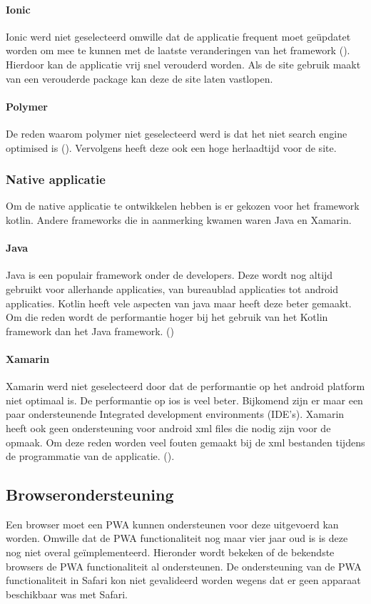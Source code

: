 \paragraph{Ionic}
Ionic werd niet geselecteerd omwille dat de applicatie frequent moet geüpdatet worden om mee te kunnen met de laatste veranderingen van het framework (\cite{ICONIC}). Hierdoor kan de applicatie vrij snel verouderd worden. Als de site gebruik maakt van een verouderde package kan deze de site laten vastlopen.

\paragraph{Polymer}
De reden waarom polymer niet geselecteerd werd is dat het niet search engine optimised is (\cite{POLYMER}). Vervolgens heeft deze ook een hoge herlaadtijd voor de site.

\subsubsection{Native applicatie}
Om de native applicatie te ontwikkelen hebben is er gekozen voor het framework kotlin. Andere frameworks die in aanmerking kwamen waren Java en Xamarin.

\paragraph{Java}
Java is een populair framework onder de developers. Deze wordt nog altijd gebruikt voor allerhande applicaties, van bureaublad applicaties tot android applicaties. Kotlin heeft vele aspecten van java maar heeft deze beter gemaakt. Om die reden wordt de performantie hoger bij het gebruik van het Kotlin framework dan het Java framework. (\cite{KOTLIN_VS_JAVA})

\paragraph{Xamarin}
Xamarin werd niet geselecteerd door dat de performantie op het android platform niet optimaal is. De performantie op ios is veel beter. Bijkomend zijn er maar een paar ondersteunende Integrated development environments (IDE’s). Xamarin heeft ook geen ondersteuning voor android xml files die nodig zijn voor de opmaak. Om deze reden worden veel fouten gemaakt bij de xml bestanden tijdens de programmatie van de applicatie. (\cite{KOTIN_VS_XAMARIN}).


\subsection{Browserondersteuning}
Een browser moet een PWA kunnen ondersteunen voor deze uitgevoerd kan worden. Omwille dat de PWA functionaliteit nog maar vier jaar oud is is deze nog niet overal geïmplementeerd. Hieronder wordt bekeken of de bekendste browsers de PWA functionaliteit al ondersteunen. De ondersteuning van de PWA functionaliteit in Safari kon niet gevalideerd worden wegens dat er geen apparaat beschikbaar was met Safari.

